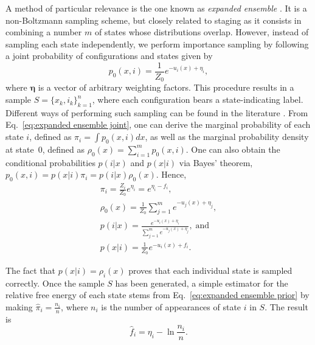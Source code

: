 \documentclass[journal=jctcce,manuscript=article,layout=twocolumn]{achemso}
\newcommand{\vt}[1]{\boldsymbol{\mathbf{#1}}}   %
\begin{document}
A method of particular relevance is the one known as \textit{expanded ensemble} \cite{Lyubartsev_1992}. It is a non-Boltzmann sampling scheme, but closely related to staging as it consists in combining a number $m$ of states whose distributions overlap. However, instead of sampling each state independently, we perform importance sampling by following a joint probability of configurations and states given by \cite{Nymeyer_2010}
\begin{equation}
\label{eq:expanded ensemble joint}
p_0(x, i) = \frac{1}{Z_0} e^{-u_i(x) + \eta_i},
\end{equation}
where $\vt \eta$ is a vector of arbitrary weighting factors. This procedure results in a sample $S = \{x_k,i_k\}_{k=1}^n$, where each configuration bears a state-indicating label. Different ways of performing such sampling can be found in the literature \cite{Lyubartsev_1992, Nymeyer_2010, Christ_2007, Christ_2008, Christ_2009, Katzgraber_2006, Trebst_2006, Escobedo_2007, Escobedo_2008, Martinez-veracoechea_2008, Chodera_2011_2}. From Eq.~\eqref{eq:expanded ensemble joint}, one can derive the marginal probability of each state $i$, defined as $\pi_i = \int p_0(x,i)dx$, as well as the marginal probability density at state~$0$, defined as $\rho_0(x) = \sum_{i=1}^m p_0(x,i)$. One can also obtain the conditional probabilities $p(i|x)$ and $p(x|i)$ via Bayes' theorem, $p_0(x,i) = p(x|i) \pi_i = p(i|x) \rho_0(x)$. Hence,
\begin{subequations}
	\label{eq:expanded ensemble probabilities}
	\begin{gather}
	\pi_i = \frac{Z_i}{Z_0} e^{\eta_i} = e^{\eta_i - f_i}, \label{eq:expanded ensemble prior} \\
	\rho_0(x) = \frac{1}{Z_0} \sum_{j=1}^m e^{-u_j(x) + \eta_j}, \label{eq:expanded ensemble evidence} \\
	p(i|x) = \frac{e^{-u_i(x) + \eta_i}}{\sum_{j=1}^m e^{-u_j(x) + \eta_j}}, \; \text{and} \label{eq:expanded ensemble posterior} \\
	p(x|i) = \frac{1}{Z_0} e^{-u_i(x) + f_i}. \label{eq:expanded ensemble likelihood}
	\end{gather}
\end{subequations}

The fact that $p(x|i) = \rho_i(x)$ proves that each individual state is sampled correctly. Once the sample $S$ has been generated, a simple estimator for the relative free energy of each state stems from Eq.~\eqref{eq:expanded ensemble prior} by making $\hat \pi_i = \frac{n_i}{n}$, where $n_i$ is the number of appearances of state $i$ in $S$. The result is
\begin{equation}
\label{eq:expanded ensemble histogram estimator}
\hat f_i = \eta_i - \ln \frac{n_i}{n}.
\end{equation}
\end{document}
